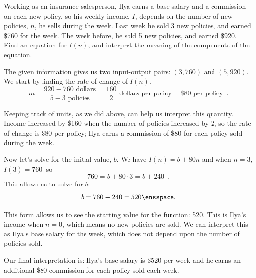 

\begin{example}
Working as an insurance salesperson, Ilya earns a base salary and a commission on each new policy, so his weekly income, $I$, depends on the number of new policies, $n$, he sells during the week. Last week he sold 3 new policies, and earned \$760 for the week. The week before, he sold 5 new policies, and earned \$920. Find an equation for $I(n)$, and interpret the meaning of the components of the equation.

\begin{solution} The given information gives us two input-output pairs: $(3,760)$ and $(5,920)$. We start by finding the rate of change of $I(n)$.
$$m = \frac{920-760 \mbox{ dollars}}{5-3\mbox{ policies}}=\frac{160}{2} \mbox{ dollars per policy} = \$80 \mbox{ per policy} \enspace .$$

Keeping track of units, as we did above, can help us interpret this quantity. Income increased by \$160 when the number of policies increased by 2, so the rate of change is \$80 per policy; Ilya earns a commission of \$80 for each policy sold during the week.

Now let's solve for the initial value, $b$. We have $I(n) = b + 80n$ and when $n = 3$, $I(3) = 760$, so
$$760 = b+80\cdot 3 = b + 240 \enspace .$$
This allows us to solve for $b$:
$$b = 760 - 240 = 520 \ensspace .$$

This form allows us to see the starting value for the function: 520. This is Ilya's income when $n = 0$, which means no new policies are sold. We can interpret this as Ilya's base salary for the week, which does not depend upon the number of policies sold.

Our final interpretation is: Ilya's base salary is \$520 per week and he earns an additional \$80 commission for each policy sold each week.
\end{solution}\end{example}


